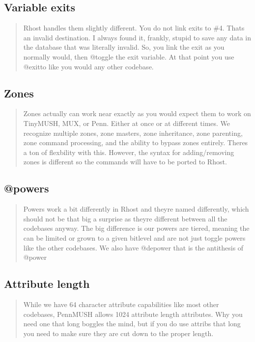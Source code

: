 \documentclass[letterpaper,10pt,english]{sphinxmanual}
\begin{document}
\subsection{Variable exits}
\label{\detokenize{differences:variable-exits}}\begin{quote}

\sphinxAtStartPar
Rhost handles them slightly different.  You do not link
exits to \#\sphinxhyphen{}4.  That\textquotesingle{}s an invalid destination.  I always found it, frankly,
stupid to save any data in the database that was literally invalid.  So,
you link the exit as you normally would, then @toggle the exit variable.
At that point you use @exitto like you would any other codebase.
\end{quote}


\subsection{Zones}
\label{\detokenize{differences:zones}}\begin{quote}

\sphinxAtStartPar
Zones actually can work near exactly as you would expect them to
work on TinyMUSH, MUX, or Penn.  Either at once or at different times.
We recognize multiple zones, zone masters, zone inheritance, zone
parenting, zone command processing, and the ability to bypass zones
entirely.  There\textquotesingle{}s a ton of flexbility with this.  However, the syntax
for adding/removing zones is different so the commands will have to be
ported to Rhost.
\end{quote}


\subsection{@powers}
\label{\detokenize{differences:powers}}\begin{quote}

\sphinxAtStartPar
Powers work a bit differently in Rhost and they\textquotesingle{}re named
differently, which should not be that big a surprise as they\textquotesingle{}re different
between all the codebases anyway.  The big difference is our powers are
tiered, meaning the can be limited or grown to a given bitlevel and are
not just toggle powers like the other codebases.  We also have @depower
that is the anti\sphinxhyphen{}thesis of @power
\end{quote}


\subsection{Attribute length}
\label{\detokenize{differences:attribute-length}}\begin{quote}

\sphinxAtStartPar
While we have 64 character attribute capabilities like
most other codebases, PennMUSH allows 1024 attribute length attributes.
Why you need one that long boggles the mind, but if you do use attribs
that long you need to make sure they are cut down to the proper length.
\end{quote}
\end{document}
